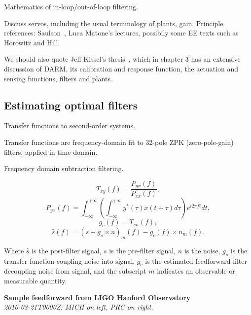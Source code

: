             Mathematics of in-loop/out-of-loop filtering.

            Discuss servos, including the usual terminology of plants, gain. Principle references: Saulson~\cite{Saulson}, Luca Matone's lectures, possibily some EE texts such as Horowitz and Hill.

	We should also quote Jeff Kissel's thesis~\cite{KisselThesis}, which in chapter 3 has an extensive discussion of DARM, its calibration and response function, the actuation and sensing functions, filters and plants.

        \subsection{Estimating optimal filters}
        \label{filter_est}

            Transfer functions to second-order systems.

		Transfer functions are frequency-domain fit to
		32-pole ZPK (zero-pole-gain) filters, applied in time domain.

            Frequency domain subtraction filtering.

            $$
            T_{xy} (f) = \frac{P_{yx}(f)}{P_{xx}(f)},
            $$
            $$
            P_{yx} (f) = \int_{-\infty}^{+\infty} \left(\int_{-\infty}^{+\infty} y^{*} (\tau) x(t+\tau) d \tau \right) e^{i 2 \pi f t} dt,
            $$
            $$
            g_c(f) = T_{sn} (f),
            $$
            $$
            \hat{s} (f) = (s + g_s \times n)_{m} (f) - g_c (f) \times n_m (f).
            $$

            Where $\hat{s}$ is the post-filter signal, $s$ is the pre-filter signal, $n$ is the noise, $g_s$ is the transfer function coupling noise into signal, $g_c$ is the estimated feedforward filter decoupling noise from signal, and the subscript $m$ indicates an observable or measurable quantity.

\textbf{Sample feedforward from LIGO Hanford Observatory}\\
\textit{2010-03-21T0000Z: MICH on left, PRC on right.}

